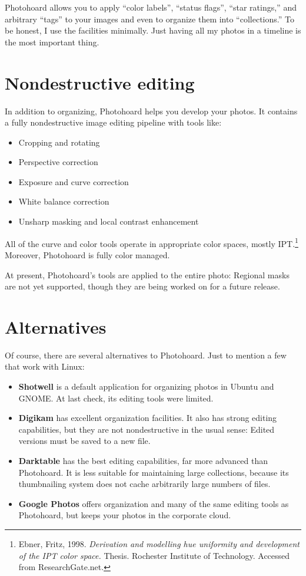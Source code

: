 \documentclass[11pt]{report}
\begin{document}
Photohoard allows you to apply ``color labels'', ``status flags'',
``star ratings,'' and
arbitrary ``tags'' to your images and even to organize them into
``collections.''  To be honest, I use the facilities
minimally. Just having all my photos in a timeline is the most
important thing.

\section{Nondestructive editing}

In addition to organizing, Photohoard helps you develop your
photos. It contains a fully nondestructive image editing pipeline with
tools like:
\begin{itemize}
\item Cropping and rotating
\item Perspective correction
\item Exposure and curve correction
\item White balance correction
\item Unsharp masking and local contrast enhancement
\end{itemize}
All of the curve and color tools operate in appropriate color spaces,
mostly IPT.\footnote{Ebner, Fritz, 1998. \emph{Derivation and modelling hue uniformity and
development of the IPT color space.} Thesis. Rochester Institute
of Technology. Accessed from ResearchGate.net.} Moreover, Photohoard is fully color managed.

At present, Photohoard's tools are applied to the entire photo:
Regional masks are not yet supported, though they are being worked on
for a future release.

\section{Alternatives}

Of course, there are several alternatives to Photohoard. Just to
mention a few that work with Linux:
\begin{itemize}
  \item {\bf Shotwell} is a default application for organizing photos
    in Ubuntu and GNOME. At last check, its editing tools were limited.
  \item {\bf Digikam} has excellent organization facilities. It also
    has strong editing capabilities, but they are not nondestructive in the
    usual sense: Edited versions must be saved to a new file.
    \item {\bf Darktable} has the best editing capabilities, far more
      advanced than Photohoard. It is less suitable for maintaining
      large collections, because its thumbnailing system does not
      cache arbitrarily large numbers of files.
      \item {\bf Google Photos} offers organization and many of the
        same editing tools as Photohoard, but keeps your photos in the
        corporate cloud.
  \end{itemize}
\end{document}
